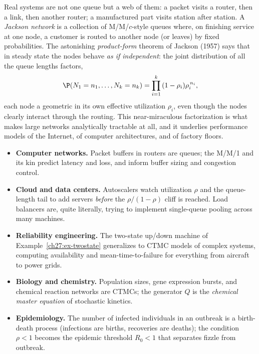 Real systems are not one queue but a web of them: a packet visits a router, then a link, then another
router; a manufactured part visits station after station. A \emph{Jackson network} is a collection of
M/M/$c$-style queues where, on finishing service at one node, a customer is routed to another node
(or leaves) by fixed probabilities. The astonishing \emph{product-form} theorem of Jackson (1957)
says that in steady state the nodes behave \emph{as if independent}: the joint distribution of all
the queue lengths factors,
\[
  \P(N_1 = n_1, \dots, N_k = n_k) = \prod_{i=1}^{k}\,(1-\rho_i)\rho_i^{\,n_i},
\]
each node a geometric in its own effective utilization $\rho_i$, even though the nodes clearly
interact through the routing. This near-miraculous factorization is what makes large networks
analytically tractable at all, and it underlies performance models of the Internet, of computer
architectures, and of factory floors.

\begin{applicationbox}
\begin{itemize}
  \item \textbf{Computer networks.} Packet buffers in routers are queues; the M/M/1 and its kin
  predict latency and loss, and inform buffer sizing and congestion control.
  \item \textbf{Cloud and data centers.} Autoscalers watch utilization $\rho$ and the queue-length
  tail to add servers \emph{before} the $\rho/(1-\rho)$ cliff is reached. Load balancers are, quite
  literally, trying to implement single-queue pooling across many machines.
  \item \textbf{Reliability engineering.} The two-state up/down machine of
  Example~\ref{ch27:ex-twostate} generalizes to CTMC models of complex systems, computing
  availability and mean-time-to-failure for everything from aircraft to power grids.
  \item \textbf{Biology and chemistry.} Population sizes, gene expression bursts, and chemical
  reaction networks are CTMCs; the generator $Q$ is the \emph{chemical master equation} of
  stochastic kinetics.
  \item \textbf{Epidemiology.} The number of infected individuals in an outbreak is a birth-death
  process (infections are births, recoveries are deaths); the condition $\rho < 1$ becomes the
  epidemic threshold $R_0 < 1$ that separates fizzle from outbreak.
\end{itemize}
\end{applicationbox}

